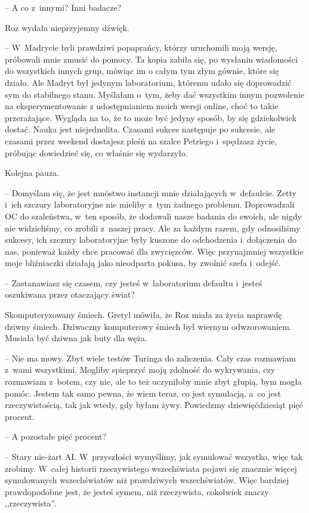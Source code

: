 \documentclass[oneside,polish,11pt,sfheadings]{mwbk}
\begin{document}
-- A co z~innymi? Inni badacze?

Roz wydała nieprzyjemny dźwięk. 

-- W~Madrycie byli prawdziwi popaprańcy,
którzy uruchomili moją wersję, próbowali mnie zmusić do pomocy. Ta kopia
zabiła się, po wysłaniu wiadomości do wszystkich innych grup, mówiąc im
o całym tym złym gównie, które się działo. Ale Madryt był jedynym
laboratorium, któremu udało się doprowadzić sym do stabilnego stanu.
Myślałam o~tym, żeby dać wszystkim innym pozwolenie na eksperymentowanie
z udostępnianiem moich wersji online, choć to takie przerażające.
Wygląda na to, że to może być jedyny sposób, by się gdziekolwiek dostać.
Nauka jest niejednolita. Czasami sukces następuje po sukcesie, ale
czasami przez weekend dostajesz pleśń na szalce Petriego i~spędzasz
życie, próbując dowiedzieć się, co właśnie się wydarzyło.

Kolejna pauza.

-- Domyślam się, że jest mnóstwo instancji mnie działających w~defaulcie.
Zetty i~ich szczury laboratoryjne nie mieliby z~tym żadnego problemu.
Doprowadzali OC do szaleństwa, w~ten sposób, że dodawali nasze badania
do swoich, ale nigdy nie widzieliśmy, co zrobili z~naszej pracy. Ale za
każdym razem, gdy odnosiliśmy sukcesy, ich szczury laboratoryjne były
kuszone do odchodzenia i~dołączenia do nas, ponieważ każdy chce pracować
dla zwycięzców. Więc przynajmniej wszystkie moje bliźniaczki działają
jako nieodparta pokusa, by zwolnić szefa i~odejść.

-- Zastanawiasz się czasem, czy jesteś w~laboratorium defaultu i~jesteś
oszukiwana przez otaczający świat?

Skomputeryzowany śmiech. Gretyl mówiła, że Roz miała za życia naprawdę
dziwny śmiech. Dziwaczny komputerowy śmiech był wiernym odwzorowaniem.
Musiała być dziwna jak buty dla węża. 

-- Nie ma mowy. Zbyt wiele testów
Turinga do zaliczenia. Cały czas rozmawiam z~wami wszystkimi. Mogliby
spieprzyć moją zdolność do wykrywania, czy rozmawiam z~botem, czy nie,
ale to też uczyniłoby mnie zbyt głupią, bym mogła pomóc. Jestem tak samo
pewna, że wiem teraz, co jest symulacją, a~co jest rzeczywistością, tak
jak wtedy, gdy byłam żywy. Powiedzmy dziewięćdziesiąt pięć procent.

-- A pozostałe pięć procent?

-- Stary nie-żart AI. W~przyszłości wymyślimy, jak symulować wszystko,
więc tak zrobimy. W~całej historii rzeczywistego wszechświata pojawi się
znacznie więcej symulowanych wszechświatów niż prawdziwych
wszechświatów. Więc bardziej prawdopodobne jest, że jesteś symem, niż
rzeczywista, cokolwiek znaczy ,,rzeczywista''.
\end{document}
